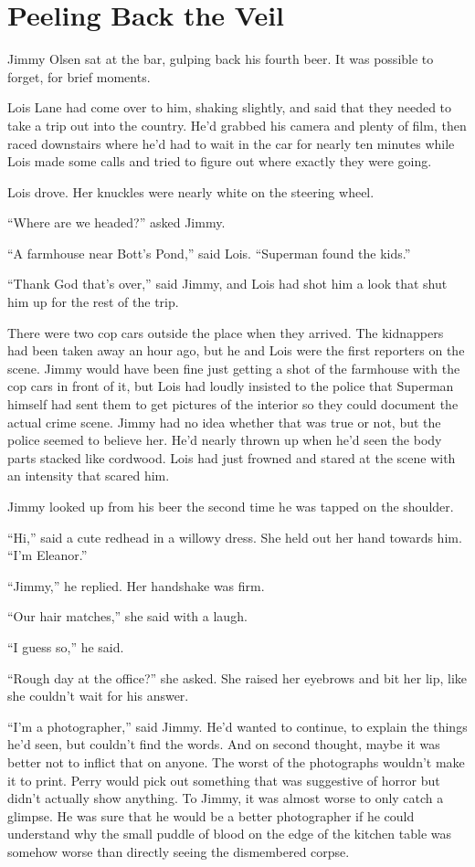 \chapter{Peeling Back the Veil}\label{peeling-back-the-veil}

Jimmy Olsen sat at the bar, gulping back his fourth beer. It was
possible to forget, for brief moments.

Lois Lane had come over to him, shaking slightly, and said that they
needed to take a trip out into the country. He'd grabbed his camera and
plenty of film, then raced downstairs where he'd had to wait in the car
for nearly ten minutes while Lois made some calls and tried to figure
out where exactly they were going.

Lois drove. Her knuckles were nearly white on the steering wheel.

``Where are we headed?'' asked Jimmy.

``A farmhouse near Bott's Pond,'' said Lois. ``Superman found the
kids.''

``Thank God that's over,'' said Jimmy, and Lois had shot him a look that
shut him up for the rest of the trip.

There were two cop cars outside the place when they arrived. The
kidnappers had been taken away an hour ago, but he and Lois were the
first reporters on the scene. Jimmy would have been fine just getting a
shot of the farmhouse with the cop cars in front of it, but Lois had
loudly insisted to the police that Superman himself had sent them to get
pictures of the interior so they could document the actual crime scene.
Jimmy had no idea whether that was true or not, but the police seemed to
believe her. He'd nearly thrown up when he'd seen the body parts stacked
like cordwood. Lois had just frowned and stared at the scene with an
intensity that scared him.

Jimmy looked up from his beer the second time he was tapped on the
shoulder.

``Hi,'' said a cute redhead in a willowy dress. She held out her hand
towards him. ``I'm Eleanor.''

``Jimmy,'' he replied. Her handshake was firm.

``Our hair matches,'' she said with a laugh.

``I guess so,'' he said.

``Rough day at the office?'' she asked. She raised her eyebrows and bit
her lip, like she couldn't wait for his answer.

``I'm a photographer,'' said Jimmy. He'd wanted to continue, to explain
the things he'd seen, but couldn't find the words. And on second
thought, maybe it was better not to inflict that on anyone. The worst of
the photographs wouldn't make it to print. Perry would pick out
something that was suggestive of horror but didn't actually show
anything. To Jimmy, it was almost worse to only catch a glimpse. He was
sure that he would be a better photographer if he could understand why
the small puddle of blood on the edge of the kitchen table was somehow
worse than directly seeing the dismembered corpse.

